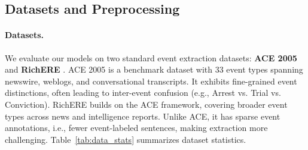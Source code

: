 \subsection{Datasets and Preprocessing} 


\paragraph{Datasets.}
We evaluate our models on two standard event extraction datasets: \textbf{ACE 2005} \cite{X} and \textbf{RichERE} \cite{Y}. ACE 2005 is a benchmark dataset with 33 event types spanning newswire, weblogs, and conversational transcripts. It exhibits fine-grained event distinctions, often leading to inter-event confusion (e.g., Arrest vs. Trial vs. Conviction). RichERE builds on the ACE framework, covering broader event types across news and intelligence reports. Unlike ACE, it has sparse event annotations, i.e., fewer event-labeled sentences, making extraction more challenging. Table~\ref{tab:data_stats} summarizes dataset statistics.



